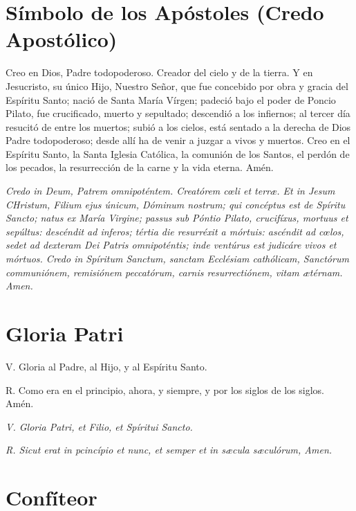 \documentclass[a4paper,11pt, oneside]{report}
\begin{document}
  \section*{Símbolo de los Apóstoles (Credo Apostólico)}

    Creo en Dios, Padre todopoderoso. Creador del cielo y de la tierra. Y en Jesucristo, su único Hijo, Nuestro Señor, que fue concebido por
    obra y gracia del Espíritu Santo; nació de Santa María Vírgen; padeció bajo el poder de Poncio Pilato, fue crucificado, muerto y sepultado;
    descendió a los infiernos; al tercer día resucitó de entre los muertos; subió a los cielos, está sentado a la derecha de Dios Padre todopoderoso;
    desde allí ha de venir a juzgar a vivos y muertos. Creo en el Espíritu Santo, la Santa Iglesia Católica, la comunión de los Santos, el perdón
    de los pecados, la resurrección de la carne y la vida eterna. Amén.

    \medskip

    \textit{Credo in Deum, Patrem omnipoténtem. Creatórem c{\oe}li et terr{\ae}. Et in Jesum CHristum, Filium ejus únicum, Dóminum nostrum; qui concéptus
    est de Spíritu Sancto; natus ex María Virgine; passus sub Póntio Pilato, crucifíxus, mortuus et sepúltus: descéndit ad inferos; tértia die resurréxit
    a mórtuis: ascéndit ad c{\oe}los, sedet ad dexteram Dei Patris omnipoténtis; inde ventúrus est judicáre vivos et mórtuos. Credo in Spíritum Sanctum,
    sanctam Ecclésiam cathólicam, Sanctórum communiónem, remisiónem peccatórum, carnis resurrectiónem, vitam {\ae}térnam. Amen.}

  \section*{Gloria Patri}

    V. Gloria al Padre, al Hijo, y al Espíritu Santo.\par
    \indent R. Como era en el principio, ahora, y siempre, y por los siglos de los siglos. Amén.

    \medskip

    \textit{V. Gloria Patri, et Filio, et Spíritui Sancto.}\par
    \indent \textit{R. Sicut erat in pcincípio et nunc, et semper et in s{\ae}cula s{\ae}culórum, Amen.}

  \section*{Confíteor}
\end{document}
